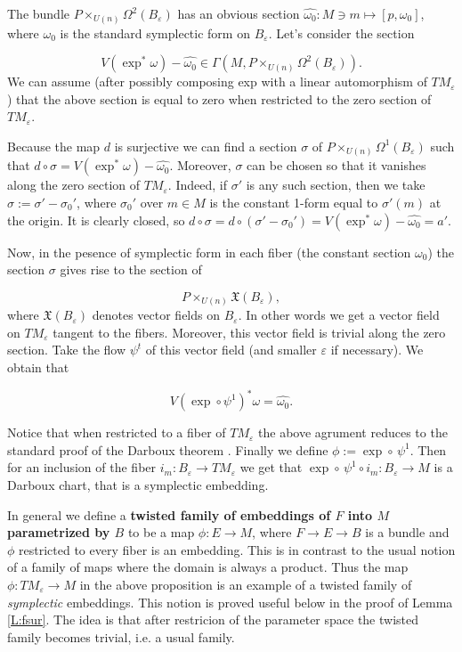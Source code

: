\documentclass[a4paper,14pt]{article}
\newcommand{\Om}{{\Omega}}
\newcommand{\om}{{\omega}}
\newcommand{\eps}{{\varepsilon}}
\newcommand{\Ga}{{\Gamma}}
\newcommand{\si}{{\sigma}}
\newcommand{\qed}{\rightline {$\Box $}}
\newcommand{\BS}{{\bigskip}}
\newcommand{\NI}{{\noindent}}
\numberwithin{equation}{section}
\numberwithin{figure}{section}
\begin{document}
The bundle $P\times _{U(n)} \Om^2(B_{\eps})$ has an obvious
section $\widehat {\om_0} :M\ni m\mapsto [p, \om_0]$, where
$\om_0$ is the standard symplectic form on $B_{\eps}$.
Let's consider the section

$$
V(\exp^*\om) - \widehat {\om _0} \in \Ga (M,P\times _{U(n)} \Om^2(B_{\eps})).
$$
We can assume (after possibly composing exp with a linear automorphism
of $TM_{\eps}$) that the above section is equal to zero when restricted
to the zero section of $TM_{\eps}$. 


Because the map $d$ is surjective we can find a section $\si $ of
$P\times _{U(n)} \Om^1(B_{\eps})$ such that 
$d\circ \si = V(\exp^*\om) - \widehat {\om_0}$. Moreover,
$\si $ can be chosen so that it vanishes along the zero
section of $TM_{\eps}$. Indeed, if $\si '$ is any such section,
then we take $\si := \si ' - \si_0'$, where $\si_0' $ over $m\in M$
is the constant 1-form 
equal to $\si ' (m)$ at the origin. It is clearly closed, so
$d\circ \si = 
d\circ (\si ' - \si_0' ) = V(\exp^*\om) - \widehat {\om_0} = a'$. 

Now, in the pesence of symplectic form in each fiber
(the constant section $\om_0$) the section $\si $
gives rise to the section of

$$
P\times _{U(n)}\mathfrak{X} (B_{\eps}),
$$
where $\mathfrak{X} (B_{\eps})$ denotes vector fields on $B_{\eps}$.
In other words we get a vector field on $TM_{\eps}$ tangent
to the fibers. Moreover, this vector field is trivial along
the zero section. Take the flow $\psi^t$ of this vector field
(and smaller $\eps $ if necessary). We obtain that

$$
V(\exp \circ \psi ^1)^*\om = \widehat {\om_0}.
$$


\NI
Notice that when restricted to a fiber of $TM_{\eps}$
the above agrument reduces to the standard proof of the
Darboux theorem \cite[Theorem 3.15]{ms}.
Finally we define $\phi := \exp \circ \, \psi^1$. Then for
an inclusion of the fiber $i_m:B_{\eps}\to TM_{\eps}$ we
get that $\exp \circ \, \psi^1 \circ i_m:B_{\eps}\to M$
is a Darboux chart, that is a symplectic embedding.

\qed

\BS
In general we define
a {\bf twisted family of 
embeddings of $F$ into $M$ parametrized by $B$}
to be a map
$\phi :E\to M$,
where $F\to E\to B$ is a bundle and $\phi $ restricted
to every fiber is an embedding.
This is in contrast to the usual notion of a family of
maps where the domain is always a product.
Thus the map 
$\phi: TM_{\eps}\to M$ 
 in the above proposition is an example of a
twisted family of {\em symplectic} embeddings.
This notion is proved useful below in the proof of Lemma \ref{L:fsur}.
The idea is that after restricion of the parameter space
the twisted family becomes trivial, i.e. a usual family.
\end{document}
